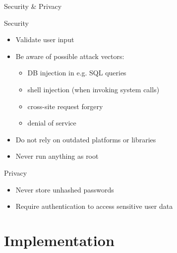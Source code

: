 \documentclass[compress]{beamer}
\begin{document}
\begin{frame}{Security \& Privacy}

    \begin{block}{Security}
        \begin{itemize}
            \item Validate user input
            \item Be aware of possible attack vectors:
            \begin{itemize}
                \item DB injection in e.g. SQL queries
                \item shell injection (when invoking system calls)
                \item cross-site request forgery
                \item denial of service
            \end{itemize}
            \item Do not rely on outdated platforms or libraries 
            \item Never run anything as root
        \end{itemize}
    \end{block}
    \begin{block}{Privacy}
        \begin{itemize}
            \item Never store unhashed passwords
            \item Require authentication to access sensitive user data
        \end{itemize}
    \end{block}

\end{frame}

\section{Implementation}
\end{document}
